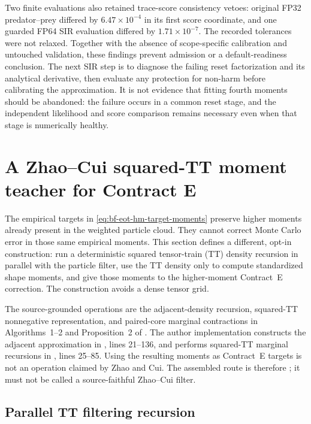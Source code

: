 Two finite evaluations also retained trace-score consistency vetoes: original
FP32 predator--prey differed by \(6.47\times10^{-4}\) in its first score
coordinate, and one guarded FP64 SIR evaluation differed by
\(1.71\times10^{-7}\).  The recorded tolerances were not relaxed.  Together
with the absence of scope-specific calibration and untouched validation,
these findings prevent admission or a default-readiness conclusion.
The next SIR step is to diagnose the failing reset factorization and its
analytical derivative, then evaluate any protection for non-harm before
calibrating the approximation.  It is not evidence that fitting fourth
moments should be abandoned: the failure occurs in a common reset stage,
and the independent likelihood and score comparison remains necessary even
when that stage is numerically healthy.

\section{A Zhao--Cui squared-TT moment teacher for Contract E}
\label{sec:bf-eot-zhao-cui-moment-teacher}

The empirical targets in
\eqref{eq:bf-eot-hm-target-moments} preserve higher moments already present in
the weighted particle cloud.  They cannot correct Monte Carlo error in those
same empirical moments.  This section defines a different, opt-in
construction: run a deterministic squared tensor-train (TT) density recursion
in parallel with the particle filter, use the TT density only to compute
standardized shape moments, and give those moments to the higher-moment
Contract~E correction.  The construction avoids a dense tensor grid.

The source-grounded operations are the adjacent-density recursion, squared-TT
nonnegative representation, and paired-core marginal contractions in
Algorithms~1--2 and Proposition~2 of \citet{zhao2024ttsequential}.  The author
implementation constructs the adjacent approximation in
,
lines 21--136, and performs squared-TT marginal recursions in
,
lines 25--85.  Using the resulting moments as Contract~E targets is not an
operation claimed by Zhao and Cui.  The assembled route is therefore
; it must not be called a source-faithful
Zhao--Cui filter.

\subsection{Parallel TT filtering recursion}


